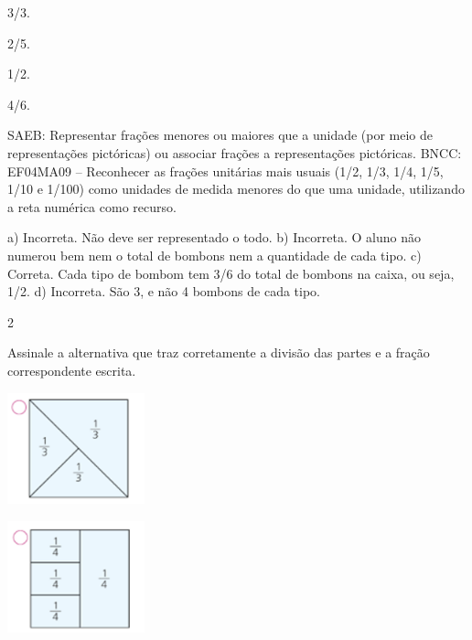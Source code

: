 \begin{mdframed}[linewidth=2pt,linecolor=salmao,roundcorner=2pt]
\begin{escolha}
{{\begin{escolha}
\item
  3/3.
\item
  2/5.
\item
  1/2.
\item
  4/6.
\end{escolha}

SAEB: Representar frações menores ou maiores que a unidade (por meio de representações
pictóricas) ou associar frações a representações pictóricas.
BNCC: EF04MA09 -- Reconhecer as frações unitárias mais usuais (1/2, 1/3, 1/4, 1/5, 1/10 e 1/100) como
unidades de medida menores do que uma unidade, utilizando a reta numérica como recurso.

a) Incorreta. Não deve ser representado o todo.
b) Incorreta. O aluno não numerou bem nem o total de bombons nem a quantidade de cada tipo.
c) Correta. Cada tipo de bombom tem 3/6 do total de bombons na caixa, ou seja, 1/2.
d) Incorreta. São 3, e não 4 bombons de cada tipo.


\num{2}

Assinale a alternativa que traz corretamente a divisão das partes e a
fração correspondente escrita.

\begin{escolha}
\item
\end{escolha}

\includegraphics[width=1.55847in,height=1.26678in]{media/image123.png}

\begin{escolha}
\item
\end{escolha}

\includegraphics[width=1.55847in,height=1.27511in]{media/image124.png}

\begin{escolha}
\item
\end{escolha}

}}
\end{escolha}
\end{mdframed}
